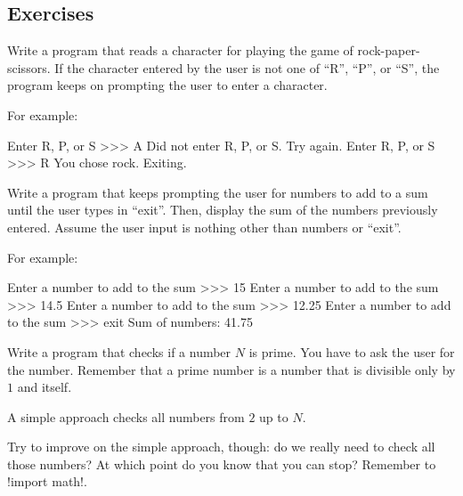 \documentclass[11pt]{cselabheader}
\begin{document}
\pagebreak
\subsection{Exercises}
\label{subsec:whileex}

\begin{ex}[rps.py] Write a program that reads a character for playing the game of
    rock-paper-scissors. If the character entered by the user is not one of
    ``R'', ``P'', or ``S'', the program keeps on prompting the user to enter a
    character.


    For example:

\begin{verbatimcode}
Enter R, P, or S >>> A
Did not enter R, P, or S. Try again.
Enter R, P, or S >>> R
You chose rock. Exiting.
\end{verbatimcode}
\end{ex}

\begin{ex}[sums.py] Write a program that keeps prompting the user for numbers to
  add to a sum until the user types in ``exit''. Then, display the sum of the
  numbers previously entered. Assume the user input is nothing other than
  numbers or ``exit''.

  For example:

  \begin{verbatimcode}
Enter a number to add to the sum >>> 15
Enter a number to add to the sum >>> 14.5
Enter a number to add to the sum >>> 12.25
Enter a number to add to the sum >>> exit
Sum of numbers: 41.75
  \end{verbatimcode}
\end{ex}

  \begin{ex}[primes.py] Write a program that checks if a number $N$ is prime.
    You have to ask the user for the number. Remember that a prime number is a
    number that is divisible only by $1$ and itself.

    A simple approach checks all numbers from $2$ up to $N$.

    Try to improve on the simple approach, though: do we really need to check
    all those numbers? At which point do you know that you can stop? Remember to
    \pythoninline!import math!.
  \end{ex}
\end{document}
